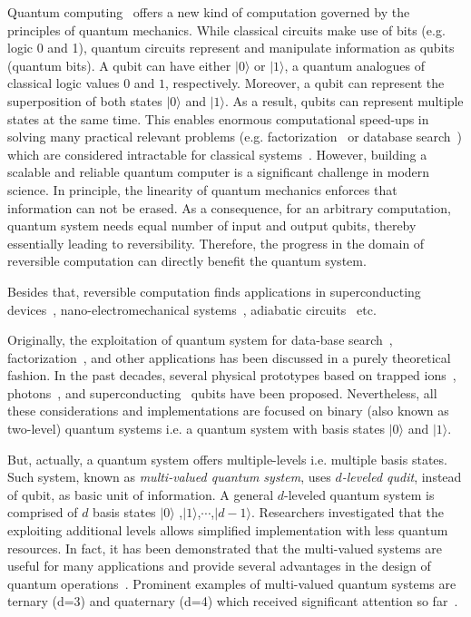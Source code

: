 \documentclass[10pt,letterpaper,twoside,openright]{book}
\begin{document}
Quantum computing~\cite{NC:2000} offers a new kind of computation governed by the principles of quantum mechanics. While classical circuits make use of bits (e.g. logic 0 and 1), quantum circuits represent and manipulate information as qubits (quantum bits). A qubit can have either $\vert 0\rangle$ or $\vert 1\rangle$, a quantum analogues of classical logic values $0$ and $1$, respectively. Moreover, a qubit can represent the superposition of both states $\vert 0\rangle$ and $\vert 1\rangle$. As a result, qubits can represent multiple states at the same time. This enables enormous computational speed-ups in solving many practical relevant problems (e.g. factorization~\cite{Sho:94} or database search~\cite{Gro:96}) which are considered intractable for classical systems~\cite{devitt2014classical}. However, building a scalable and reliable quantum computer is a significant challenge in modern science. In principle, the linearity of quantum mechanics enforces that information can not be erased. As a consequence, for an arbitrary computation, quantum system needs equal number of input and output qubits, thereby essentially leading to reversibility. Therefore, the progress in the domain of reversible computation can directly benefit the quantum system.

Besides that, reversible computation finds applications in superconducting devices~\cite{Ren:2009}, nano-electromechanical systems~\cite{Mer:93,Houri:2013}, adiabatic circuits~\cite{Athas:1994} etc.  

Originally, the exploitation of quantum system for data-base search~\cite{Gro:96}, factorization~\cite{Sho:94}, and other applications has been discussed in a purely theoretical fashion. In the past decades, several physical prototypes based on trapped ions~\cite{Cirac:1995}, photons~\cite{OBrien:2009}, and superconducting~\cite{Galiautdinov2007} qubits have been proposed. Nevertheless, all these considerations and implementations are focused on binary (also known as two-level) quantum systems i.e. a quantum system with basis states $\vert 0\rangle$ and $\vert 1\rangle$.

But, actually, a quantum system offers multiple-levels i.e. multiple basis states. Such system, known as \emph{multi-valued quantum system}, uses \emph{$d$-leveled qudit}, instead of qubit, as basic unit of information. A general $d$-leveled quantum system is comprised of $d$ basis states $\vert 0\rangle$ ,$\vert 1\rangle$,$\cdots$,$\vert d-1\rangle$. Researchers investigated that the exploiting additional levels allows simplified implementation with less quantum resources. In fact, it has been demonstrated that the multi-valued systems are useful for many applications and provide several advantages in the design of quantum operations~\cite{Cabello:2011,lanyon2009}. Prominent examples of multi-valued quantum systems are ternary (d=3) and quaternary (d=4) which received significant attention so far~\cite{Cabello:2011,Greentree:2004,Klimov:2003,Moreva:2006}.    
\end{document}
